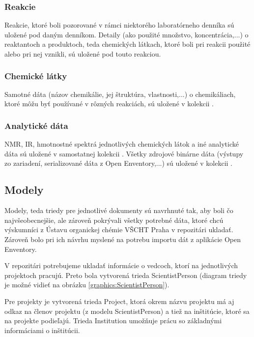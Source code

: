 \documentclass[thesis=M,slovak]{FITthesis}[2013/05/06]
\begin{document}
\subsubsection{Reakcie}
Reakcie, ktoré boli pozorované v rámci niektorého laboratórneho denníka sú uložené pod daným denníkom. Detaily (ako použité množstvo, koncentrácia,...) o reaktantoch a produktoch, teda chemických látkach, ktoré boli pri reakcii použité alebo pri nej vznikli, sú uložené pod touto reakciou.

\subsubsection{Chemické látky}
Samotné dáta (názov chemikálie, jej štruktúra, vlastnosti,...) o chemikáliach, ktoré môžu byť používané v rôzných reakciách, sú uložené v kolekcii .

\subsubsection{Analytické dáta}
NMR, IR, hmotnostné spektrá jednotlivých chemických látok a iné analytické dáta sú uložené v samostatnej kolekcii . Všetky zdrojové binárne dáta (výstupy zo zariadení, serializované dáta z Open Enventory,...) sú uložené v kolekcii .

\subsection{Modely}
Modely, teda triedy pre jednotlivé dokumenty sú navrhnuté tak, aby boli čo najvšeobecnejšie, ale zároveň pokrývali všetky potrebné dáta, ktoré chcú výskumníci z Ústavu organickej chémie VŠCHT Praha v repozitári ukladať. Zároveň bolo pri ich návrhu myslené na potrebu importu dát z aplikácie Open Enventory.

V repozitári potrebujeme ukladať informácie o vedcoch, ktorí na jednotlivých projektoch pracujú. Preto bola vytvorená trieda ScientistPerson (diagram triedy je možné vidieť na obrázku \ref{graphics:ScientistPerson}).

Pre projekty je vytvorená trieda Project, ktorá okrem názvu projektu má aj odkaz na členov projektu (z modelu ScientistPerson) a tiež na inštitúcie, ktoré sa na projekte podieľajú. Trieda Institution umožňuje prácu so základnými informáciami o inštitúcii.
\end{document}
